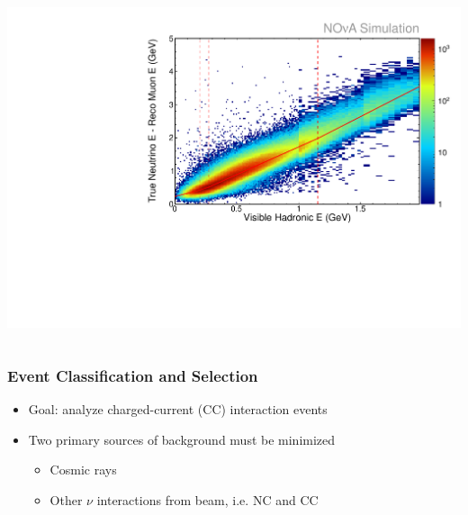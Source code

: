 \documentclass[10pt,professionalfonts,xcolor=table]{beamer}
\begin{document}
\begin{frame}
\begin{columns}[c]
\includegraphics[height=\textwidth, angle=-90]{figures/plots/reco/numu_energy_had_fit.pdf}

\end{columns}


\end{frame}

\begin{frame}
\end{frame}



\begin{frame}
\frametitle{Event Classification and Selection}

\begin{itemize}
\item Goal: analyze \numu charged-current (CC) interaction events
\gap
\item Two primary sources of background must be minimized
  \begin{itemize}
  \item Cosmic rays
  \item Other $\nu$ interactions from beam, i.e. NC and \nue CC
  \end{itemize}
\end{itemize}
\end{frame}
\end{document}
